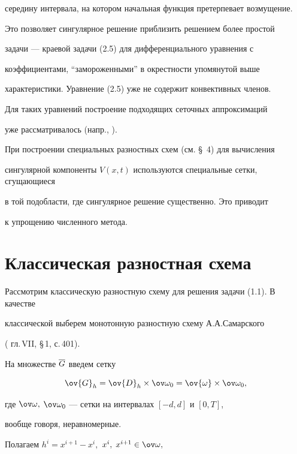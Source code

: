 середину интервала, на котором начальная функция претерпевает возмущение.


Это позволяет сингулярное решение приблизить решением более простой 


задачи --- краевой задачи (2.5) для дифференциального уравнения с


коэффициентами, ``замороженными'' в окрестности упомянутой выше 


характеристики. Уравнение (2.5) уже не содержит конвективных членов. 


Для таких уравнений построение подходящих сеточных аппроксимаций


уже рассматривалось (напр., \cite{Sh2}).





При построении специальных разностных схем (см. \S~4) для вычисления


сингулярной компоненты $V(x,t)$ используются специальные сетки, сгущающиеся


в той подобласти, где сингулярное решение существенно. Это приводит


к упрощению численного метода.





\section{Классическая разностная схема}





Рассмотрим классическую разностную схему для решения задачи (1.1). В качестве 


классической выберем монотонную разностную схему А.А.Самарского 


(\cite{Sa} гл.\,VII, \S\,1, с.\,401). 


На множестве $\overline{G}$ введем сетку 


\begin{equation}\label{3.1}


\ov{G}_h=\ov{D}_h\times\ovo_0=\ov{\om}\times\ovo_0,


\end{equation}


где $\ovo,$ $\ovo_0$ --- сетки на интервалах $[-d,d]$ и $[0,T]$, 


вообще говоря, неравномерные.


Полагаем $h^i=x^{i+1}-x^i,$ $x^i,\;x^{i+1}\in\ovo,$


